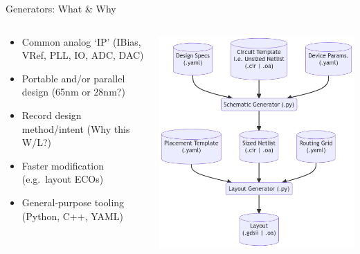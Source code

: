 \begin{frame}{Generators: What \& Why}
\protect\hypertarget{generators-what-why}{}
\begin{columns}[T]
\begin{column}{0.48\textwidth}
\begin{itemize}
\tightlist
\item
  Common analog `IP' (IBias, VRef, PLL, IO, ADC, DAC)
\item
  Portable and/or parallel design (65nm or 28nm?)
\item
  Record design method/intent (Why this W/L?)
\item
  Faster modification (e.g.~layout ECOs)
\item
  General-purpose tooling (Python, C++, YAML)
\end{itemize}
\end{column}

\begin{column}{0.48\textwidth}
\includegraphics{../images/flow.png}
\end{column}
\end{columns}
\end{frame}

